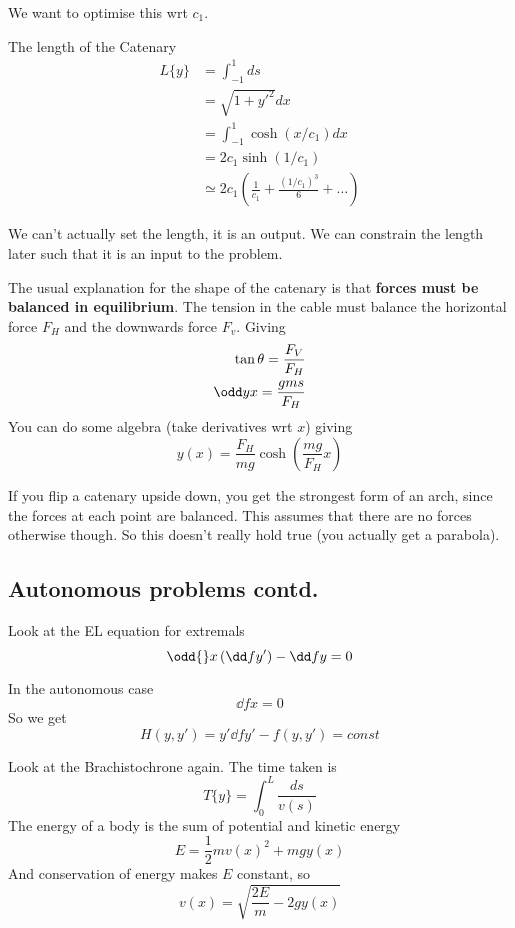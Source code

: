 \documentclass{X:/Documents/Coding/Latex/myassignment}
\begin{document}
We want to optimise this wrt $c_1$.

The length of the Catenary 
\begin{align*}
	L\{y\} &= \int_{-1}^1 ds\\
	&= \sqrt{1+y'^2} dx\\
	&= \int_{-1}^1 \cosh(x/c_1) dx\\
	&= 2c_1 \sinh(1/c_1)\\
	&\simeq 2c_1(\frac{1}{c_1} + \frac{(1/c_1)^3}{6} + \ldots)
\end{align*}

We can't actually set the length, it is an output. We can constrain the length later such that it is an input to the problem.

The usual explanation for the shape of the catenary is that \textbf{forces must be balanced in equilibrium}.
The tension in the cable must balance the horizontal force $F_H$ and the downwards force $F_v$. Giving
\begin{align*}
	\tan \theta = \frac{F_V}{F_H}\\
	\odd yx = \frac{gms}{F_H}
\end{align*}
You can do some algebra (take derivatives wrt $x$) giving
\[y(x) = \frac{F_H}{mg} \cosh\left(\frac{mg}{F_H}x\right)\]

If you flip a catenary upside down, you get the strongest form of an arch, since the forces at each point are balanced. This assumes that there are no forces otherwise though. So this doesn't really hold true (you actually get a parabola).



\subsection{Autonomous problems contd.}

Look at the EL equation for extremals
\[\odd{}x \left(\dd f{y'}\right) - \dd fy = 0\]

In the autonomous case 
\[\dd fx = 0\]
So we get
\[H(y,y') = y' \dd f{y'} - f(y,y') = const\]

Look at the Brachistochrone again. The time taken is
\[T\{y\} = \int_0^L \frac{ds}{v(s)}\]
The energy of a body is the sum of potential and kinetic energy
\[E = \frac12 mv(x)^2 + mgy(x)\]
And conservation of energy makes $E$ constant, so
\[v(x) = \sqrt{\frac{2E}{m} - 2gy(x)}\]
\end{document}
